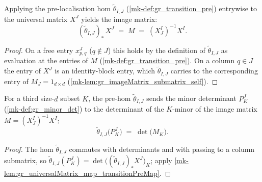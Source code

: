 \begin{lemma}\label{mk-lem:gr_universalMatrix_map_transitionPreMap}
  \leanok

  Applying the pre-localisation hom \(\tilde\theta_{I,J}\)
  (\ref{mk-def:gr_transition_pre}) entrywise to the universal matrix \(X^J\) yields
  the image matrix:
  \[
    (\tilde\theta_{I,J})_\ast\, X^J \;=\; M \;=\; (X^I_J)^{-1} X^I .
  \]
\end{lemma}
\begin{proof}
  \leanok

On a free entry \(x^J_{p,q}\) (\(q \notin J\)) this holds by the definition of
  \(\tilde\theta_{I,J}\) as evaluation at the entries of \(M\)
  (\ref{mk-def:gr_transition_pre}). On a column \(q \in J\) the entry of \(X^J\) is
  an identity-block entry, which \(\tilde\theta_{I,J}\) carries to the
  corresponding entry of \(M_J = 1_{d\times d}\)
  (\ref{mk-lem:gr_imageMatrix_submatrix_self}).
\end{proof}

\begin{lemma}\label{mk-lem:gr_transitionPreMap_minorDet}
  \leanok

  For a third size-\(d\) subset \(K\), the pre-hom \(\tilde\theta_{I,J}\) sends the
  minor determinant \(P^J_K\) (\ref{mk-def:gr_minor_det}) to the determinant of the
  \(K\)-minor of the image matrix \(M = (X^I_J)^{-1} X^I\):
  \[
    \tilde\theta_{I,J}\bigl(P^J_K\bigr) \;=\; \det\bigl(M_K\bigr).
  \]
\end{lemma}
\begin{proof}
  \leanok

The hom \(\tilde\theta_{I,J}\) commutes with determinants and with passing to
  a column submatrix, so \(\tilde\theta_{I,J}(P^J_K) =
  \det\bigl((\tilde\theta_{I,J})_\ast X^J\bigr)_K\); apply
  \ref{mk-lem:gr_universalMatrix_map_transitionPreMap}.
\end{proof}

